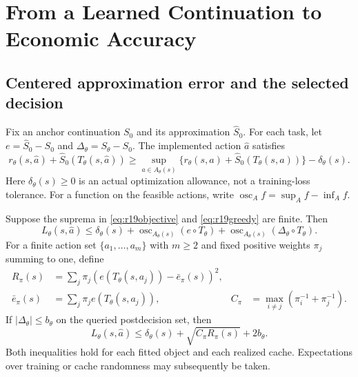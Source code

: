\section{From a Learned Continuation to Economic Accuracy}\label{sec:r19decision}
\subsection{Centered approximation error and the selected decision}
Fix an anchor continuation $S_0$ and its approximation $\widehat S_0$.
For each task, let $e=\widehat S_0-S_0$ and
$\Delta_\theta=S_\theta-S_0$. The implemented action $\widehat a$ satisfies
\begin{equation}
 r_\theta(s,\widehat a)+\widehat S_0(T_\theta(s,\widehat a))
 \geq \sup_{a\in A_\theta(s)}
 \{r_\theta(s,a)+\widehat S_0(T_\theta(s,a))\}-\delta_\theta(s).
 \label{eq:r19greedy}
\end{equation}
Here $\delta_\theta(s)\geq0$ is an actual optimization allowance, not a
training-loss tolerance. For a function on the feasible actions, write
$\operatorname{osc}_A f=\sup_A f-\inf_A f$.

\begin{proposition}
\label{prop:r19decision}
Suppose the suprema in \eqref{eq:r19objective} and
\eqref{eq:r19greedy} are finite. Then
\begin{equation}
 L_\theta(s,\widehat a)\leq\delta_\theta(s)
  +\operatorname{osc}_{A_\theta(s)}(e\circ T_\theta)
  +\operatorname{osc}_{A_\theta(s)}(\Delta_\theta\circ T_\theta).
 \label{eq:r19osc}
\end{equation}
For a finite action set $\{a_1,\ldots,a_m\}$ with $m\geq2$ and fixed
positive weights $\pi_j$ summing to one, define
\begin{align*}
 R_\pi(s)&=\sum_j\pi_j(e(T_\theta(s,a_j))-\bar e_\pi(s))^2,\\
 \bar e_\pi(s)&=\sum_j\pi_j e(T_\theta(s,a_j)),
 &C_\pi&=\max_{i\ne j}(\pi_i^{-1}+\pi_j^{-1}).
\end{align*}
If $|\Delta_\theta|\leq b_\theta$ on the queried postdecision set, then
\begin{equation}
 L_\theta(s,\widehat a)\leq\delta_\theta(s)
                       +\sqrt{C_\pi R_\pi(s)}+2b_\theta.
 \label{eq:r19riskloss}
\end{equation}
Both inequalities hold for each fitted object and each realized cache.
Expectations over training or cache randomness may subsequently be taken.
\end{proposition}

